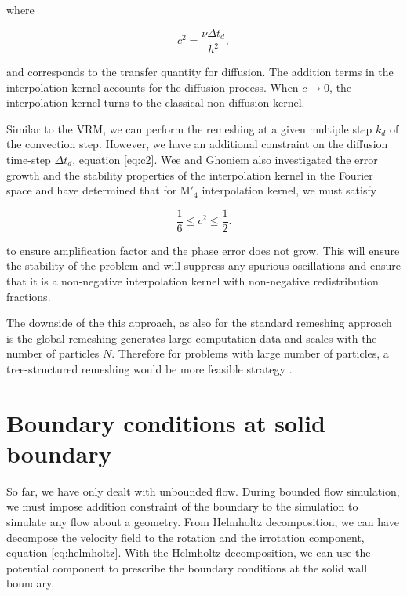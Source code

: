 where 

\begin{equation}
c^2 = \frac{\nu \Delta t_d}{h^2},
\label{eq:c2}
\end{equation}

and corresponds to the transfer quantity for diffusion. The addition terms in the interpolation kernel accounts for the diffusion process. When $c \rightarrow 0$, the interpolation kernel turns to the classical non-diffusion kernel. 

Similar to the VRM, we can perform the remeshing at a given multiple step $k_d$ of the convection step. However, we have an additional constraint on the diffusion time-step $\Delta t_d$, equation \ref{eq:c2}. Wee and Ghoniem \cite{Wee2006} also investigated the error growth and the stability properties of the interpolation kernel in the Fourier space and have determined that for $\mathrm{M'}_4$ interpolation kernel, we must satisfy

\begin{equation}
\frac{1}{6} \le c^2 \le \frac{1}{2}.
\label{eq:c2stability}
\end{equation}

to ensure amplification factor and the phase error does not grow. This will ensure the stability of the problem and will suppress any spurious oscillations and ensure that it is a non-negative interpolation kernel with non-negative redistribution fractions.

The downside of the this approach, as also for the standard remeshing approach is the global remeshing generates large computation data and scales with the number of particles $N$. Therefore for problems with large number of particles, a tree-structured remeshing would be more feasible strategy \cite{Winckelmans1996}.

\section{Boundary conditions at solid boundary}
\label{sec:boundaryConditions}

So far, we have only dealt with unbounded flow. During bounded flow simulation, we must impose addition constraint of the boundary to the simulation to simulate any flow about a geometry. From Helmholtz decomposition, we can have decompose the velocity field to the rotation and the irrotation component, equation \ref{eq:helmholtz}. With the Helmholtz decomposition, we can use the potential component to prescribe the boundary conditions at the solid wall boundary,

